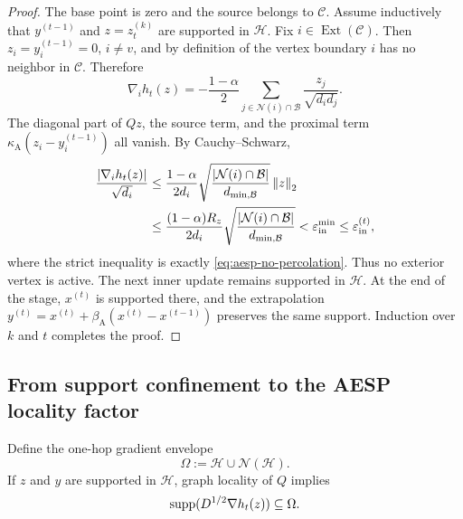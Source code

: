 \begin{proof}
The base point is zero and the source belongs to \(\mathcal C\).  Assume
inductively that \(y^{(t-1)}\) and \(z=z_t^{(k)}\) are supported in
\(\mathcal H\).  Fix \(i\in\operatorname{Ext}(\mathcal C)\).  Then
\(z_i=y_i^{(t-1)}=0\), \(i\neq v\), and by definition of the vertex boundary
\(i\) has no neighbor in \(\mathcal C\).  Therefore
\begin{equation}
    \nabla_i h_t(z)
    =-\frac{1-\alpha}{2}
      \sum_{j\in\mathcal N(i)\cap\mathcal B}
      \frac{z_j}{\sqrt{d_i d_j}}.
    \label{eq:exterior-inner-gradient}
\end{equation}
The diagonal part of \(Qz\), the source term, and the proximal term
\(\kappa_{\mathrm A}(z_i-y_i^{(t-1)})\) all vanish.  By Cauchy--Schwarz,
\begin{align}
  \frac{\left\lvert \nabla_i h_t(z)\right\rvert}{\sqrt{d_i}}
  &\leq
  \frac{1-\alpha}{2d_i}
  \sqrt{\frac{\left\lvert \mathcal N(i)\cap\mathcal B\right\rvert}
              {d_{\min,\mathcal B}}}
  \left\lVert z\right\rVert_2
  \notag\\
  &\leq
  \frac{(1-\alpha)R_z}{2d_i}
  \sqrt{\frac{\left\lvert \mathcal N(i)\cap\mathcal B\right\rvert}
              {d_{\min,\mathcal B}}}
  <\varepsilon_{\mathrm{in}}^{\min}\leq\varepsilon_{\mathrm{in}}^{(t)},
  \label{eq:exterior-gradient-bound}
\end{align}
where the strict inequality is exactly
\cref{eq:aesp-no-percolation}.  Thus no exterior vertex is active.  The next
inner update remains supported in \(\mathcal H\).  At the end of the stage,
\(x^{(t)}\) is supported there, and the extrapolation
\(
 y^{(t)}=x^{(t)}+\beta_{\mathrm A}(x^{(t)}-x^{(t-1)})
\)
preserves the same support.  Induction over \(k\) and \(t\) completes the
proof.
\end{proof}

\subsection{From support confinement to the AESP locality factor}

Define the one-hop gradient envelope
\begin{equation}
    \Omega:=\mathcal H\cup\mathcal N(\mathcal H).
    \label{eq:gradient-envelope}
\end{equation}
If \(z\) and \(y\) are supported in \(\mathcal H\), graph locality of \(Q\)
implies
\begin{equation}
    \operatorname{supp}(D^{1/2}\nabla h_t(z))\subseteq\Omega.
    \label{eq:gradient-support-envelope}
\end{equation}

